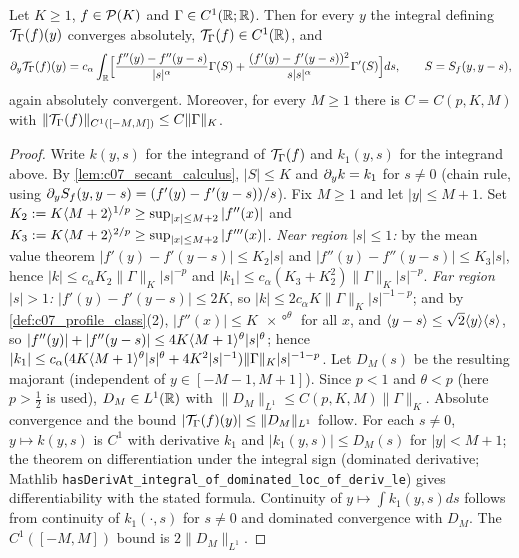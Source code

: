 \begin{lemma}
  \label{lem:c07_kernel_C1}
  Let $K\ge1$, $f\in\mathcal{P}(K)$ and $\Gamma\in C^1(\mathbb{R};\mathbb{R})$. Then for every $y$ the integral defining
  $\mathcal{T}_\Gamma(f)(y)$ converges absolutely, $\mathcal{T}_\Gamma(f)\in C^1(\mathbb{R})$, and
  \[
    \partial_y\mathcal{T}_\Gamma(f)(y)=c_\alpha\int_{\mathbb{R}}\Bigl[\frac{f''(y)-f''(y-s)}{|s|^\alpha}\Gamma(S)
     +\frac{(f'(y)-f'(y-s))^2}{s|s|^\alpha}\Gamma'(S)\Bigr]ds,\qquad S=S_f(y,y-s),
  \]
  again absolutely convergent. Moreover, for every $M\ge1$ there is $C=C(p,K,M)$ with
  $\|\mathcal{T}_\Gamma(f)\|_{C^1([-M,M])}\le C\|\Gamma\|_K$.
\end{lemma}
\begin{proof}
  Write $k(y,s)$ for the integrand of $\mathcal{T}_\Gamma(f)$ and $k_1(y,s)$ for the integrand above. By
  \cref{lem:c07_secant_calculus}, $|S|\le K$ and $\partial_yk=k_1$ for $s\neq0$ (chain rule, using
  $\partial_y S_f(y,y-s)=(f'(y)-f'(y-s))/s$). Fix $M\ge1$ and let $|y|\le M+1$.
  Set $K_2:=K\langle M+2 \rangle^{1/p}\ge\sup_{|x|\le M+2}|f''(x)|$ and $K_3:=K\langle M+2 \rangle^{2/p}\ge\sup_{|x|\le M+2}|f'''(x)|$.
  \emph{Near region $|s|\le1$:} by the mean value theorem $|f'(y)-f'(y-s)|\le K_2|s|$ and
  $|f''(y)-f''(y-s)|\le K_3|s|$, hence
  $|k|\le c_\alpha K_2\|\Gamma\|_K|s|^{-p}$ and $|k_1|\le c_\alpha(K_3+K_2^2)\|\Gamma\|_K|s|^{-p}$.
  \emph{Far region $|s|>1$:} $|f'(y)-f'(y-s)|\le2K$, so $|k|\le 2c_\alpha K\|\Gamma\|_K|s|^{-1-p}$; and by
  \cref{def:c07_profile_class}(2), $|f''(x)|\le K\ang{x}^\theta$ for all $x$, and
  $\langle y-s \rangle\le\sqrt2\langle y \rangle\langle s \rangle$, so $|f''(y)|+|f''(y-s)|\le 4K\langle M+1 \rangle^\theta|s|^\theta$; hence
  $|k_1|\le c_\alpha(4K\langle M+1 \rangle^\theta|s|^{\theta}+4K^2|s|^{-1})\|\Gamma\|_K|s|^{-1-p}$.
  Let $D_M(s)$ be the resulting majorant (independent of $y\in[-M-1,M+1]$). Since $p<1$ and
  $\theta<p$ (here $p>\tfrac12$ is used), $D_M\in L^1(\mathbb{R})$ with $\|D_M\|_{L^1}\le C(p,K,M)\|\Gamma\|_K$.
  Absolute convergence and the bound $|\mathcal{T}_\Gamma(f)(y)|\le\|D_M\|_{L^1}$ follow. For each $s\ne0$,
  $y\mapsto k(y,s)$ is $C^1$ with derivative $k_1$ and $|k_1(y,s)|\le D_M(s)$ for $|y|<M+1$; the
  theorem on differentiation under the integral sign (dominated derivative; Mathlib
  \texttt{hasDerivAt\_integral\_of\_dominated\_loc\_of\_deriv\_le}) gives differentiability with the stated
  formula. Continuity of $y\mapsto\int k_1(y,s)ds$ follows from continuity of $k_1(\cdot,s)$ for
  $s\ne0$ and dominated convergence with $D_M$. The $C^1([-M,M])$ bound is $2\|D_M\|_{L^1}$.
\end{proof}

